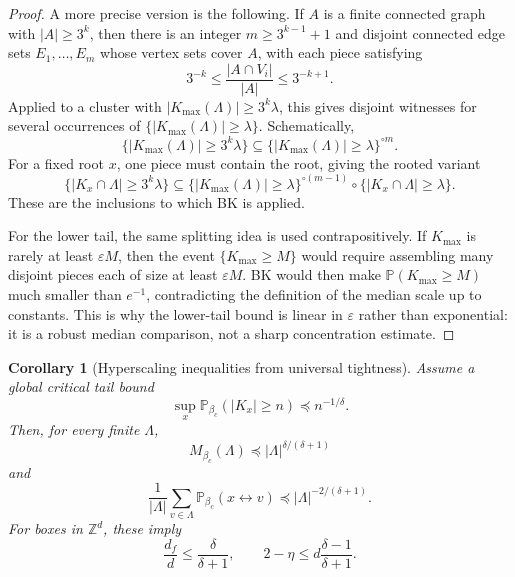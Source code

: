 \documentclass[11pt,reqno]{book}
\numberwithin{equation}{chapter}
\theoremstyle{plain}
\newtheorem{corollary}[theorem]{Corollary}
\theoremstyle{definition}
\theoremstyle{remark}
\renewcommand{\P}{\mathbb P}
\newcommand{\eps}{\varepsilon}
\newcommand{\1}{\mathbf 1}
\newcommand{\pre}{\preceq}
\begin{document}
\begin{proof}
A more precise version is the following. If \(A\) is a finite connected graph with \(|A|\geq 3^k\), then there is an integer \(m\geq 3^{k-1}+1\) and disjoint connected edge sets \(E_1,\ldots,E_m\) whose vertex sets cover \(A\), with each piece satisfying
\[
  3^{-k}\leq \frac{|A\cap V_i|}{|A|}\leq 3^{-k+1}.
\]
Applied to a cluster with \(|K_{\max}(\Lambda)|\geq 3^k\lambda\), this gives disjoint witnesses for several occurrences of \(\{|K_{\max}(\Lambda)|\geq\lambda\}\). Schematically,
\[
  \{|K_{\max}(\Lambda)|\geq 3^k\lambda\}
  \subseteq
  \{|K_{\max}(\Lambda)|\geq\lambda\}^{\circ m}.
\]
For a fixed root \(x\), one piece must contain the root, giving the rooted variant
\[
  \{|K_x\cap\Lambda|\geq 3^k\lambda\}
  \subseteq
  \{|K_{\max}(\Lambda)|\geq\lambda\}^{\circ(m-1)}
  \circ
  \{|K_x\cap\Lambda|\geq\lambda\}.
\]
These are the inclusions to which BK is applied.

For the lower tail, the same splitting idea is used contrapositively. If \(K_{\max}\) is rarely at least \(\eps M\), then the event \(\{K_{\max}\ge M\}\) would require assembling many disjoint pieces each of size at least \(\eps M\). BK would then make \(\P(K_{\max}\ge M)\) much smaller than \(e^{-1}\), contradicting the definition of the median scale up to constants. This is why the lower-tail bound is linear in \(\eps\) rather than exponential: it is a robust median comparison, not a sharp concentration estimate.
\end{proof}

\begin{corollary}[Hyperscaling inequalities from universal tightness]
Assume a global critical tail bound
\[
  \sup_x\P_{\beta_c}(|K_x|\geq n)\pre n^{-1/\delta}.
\]
Then, for every finite \(\Lambda\),
\[
  M_{\beta_c}(\Lambda)\pre |\Lambda|^{\delta/(\delta+1)}
\]
and
\[
  \frac1{|\Lambda|}\sum_{v\in\Lambda}\P_{\beta_c}(x\leftrightarrow v)
  \pre
  |\Lambda|^{-2/(\delta+1)}.
\]
For boxes in \(\mathbb Z^d\), these imply
\[
  \frac{d_f}{d}\leq \frac{\delta}{\delta+1},
  \qquad
  2-\eta\leq d\frac{\delta-1}{\delta+1}.
\]
\end{corollary}
\end{document}
